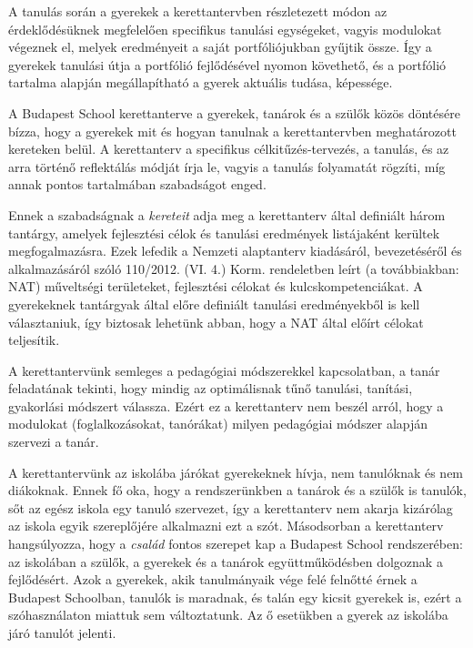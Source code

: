 A tanulás során a gyerekek a kerettantervben részletezett módon az
érdeklődésüknek megfelelően specifikus tanulási egységeket, vagyis modulokat
végeznek el, melyek eredményeit a saját portfóliójukban gyűjtik össze. Így a
gyerekek tanulási útja a portfólió fejlődésével nyomon követhető, és a
portfólió tartalma alapján megállapítható a gyerek aktuális tudása, képessége.

A Budapest School kerettanterve a gyerekek, tanárok és a szülők közös döntésére
bízza, hogy a gyerekek mit és hogyan tanulnak a kerettantervben meghatározott
kereteken belül.
A kerettanterv
a specifikus célkitűzés-tervezés, a tanulás, és az arra történő reflektálás
módját írja le, vagyis a tanulás folyamatát rögzíti, míg annak pontos
tartalmában szabadságot enged.

Ennek a szabadságnak a \emph{kereteit} adja meg a kerettanterv által definiált
három tantárgy, amelyek fejlesztési célok és tanulási eredmények listájaként
kerültek megfogalmazásra. Ezek
lefedik a Nemzeti alaptanterv kiadásáról, bevezetéséről és alkalmazásáról
szóló 110/2012. (VI. 4.) Korm. rendeletben leírt (a továbbiakban: NAT) műveltségi
területeket, fejlesztési célokat és kulcskompetenciákat. A gyerekeknek tantárgyak
által előre definiált tanulási eredményekből is kell
választaniuk, így biztosak lehetünk abban, hogy a NAT által előírt célokat
teljesítik.

A kerettantervünk semleges a pedagógiai módszerekkel kapcsolatban, a tanár
feladatának tekinti, hogy mindig az optimálisnak tűnő tanulási, tanítási,
gyakorlási módszert válassza. Ezért ez a kerettanterv nem beszél arról, hogy a
modulokat (foglalkozásokat, tanórákat) milyen pedagógiai módszer alapján
szervezi a tanár.

A kerettantervünk az iskolába járókat gyerekeknek hívja, nem tanulóknak és nem
diákoknak. Ennek fő oka, hogy a rendszerünkben a tanárok és a szülők is
tanulók, sőt az egész iskola egy tanuló szervezet, így a kerettanterv nem akarja  kizárólag
az iskola egyik szereplőjére alkalmazni ezt a szót. Másodsorban a kerettanterv
hangsúlyozza, hogy a \emph{család} fontos szerepet kap a Budapest School
rendszerében: az iskolában a szülők, a gyerekek és a tanárok együttműködésben dolgoznak
a fejlődésért. Azok a gyerekek, akik tanulmányaik vége felé felnőtté érnek a
Budapest Schoolban, tanulók is maradnak, és talán egy kicsit gyerekek is, ezért
a szóhasználaton miattuk sem változtatunk. Az ő esetükben a gyerek az iskolába
járó tanulót jelenti.


